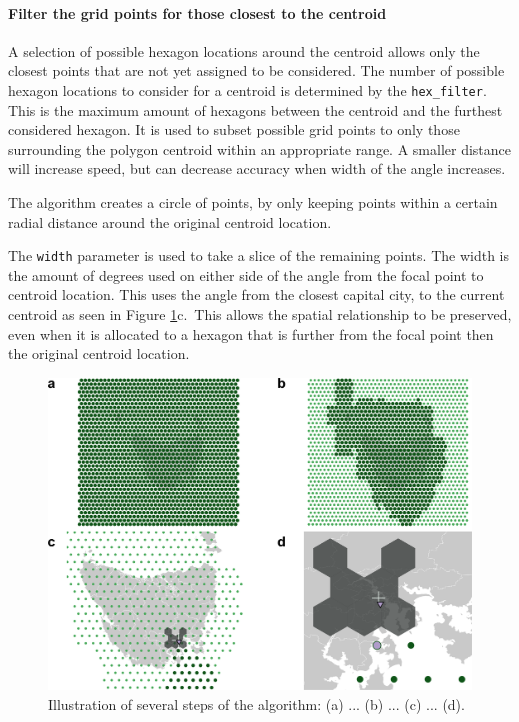 \hypertarget{filter-the-grid-points-for-those-closest-to-the-centroid}{%
\paragraph{Filter the grid points for those closest to the
centroid}\label{filter-the-grid-points-for-those-closest-to-the-centroid}}

A selection of possible hexagon locations around the centroid allows
only the closest points that are not yet assigned to be considered. The
number of possible hexagon locations to consider for a centroid is
determined by the \texttt{hex\_filter}. This is the maximum amount of
hexagons between the centroid and the furthest considered hexagon. It is
used to subset possible grid points to only those surrounding the
polygon centroid within an appropriate range. A smaller distance will
increase speed, but can decrease accuracy when width of the angle
increases.

The algorithm creates a circle of points, by only keeping points within
a certain radial distance around the original centroid location.

The \texttt{width} parameter is used to take a slice of the remaining
points. The width is the amount of degrees used on either side of the
angle from the focal point to centroid location. This uses the angle
from the closest capital city, to the current centroid as seen in Figure
\ref{fig:filterprocess}c.~This allows the spatial relationship to be
preserved, even when it is allocated to a hexagon that is further from
the focal point then the original centroid location.

\begin{Schunk}
\begin{figure}
\includegraphics[width=0.95\linewidth]{kobakian-cook_files/figure-latex/filterprocess-1} \caption[Illustration of several steps of the algorithm]{Illustration of several steps of the algorithm: (a) ... (b) ... (c) ... (d). }\label{fig:filterprocess}
\end{figure}
\end{Schunk}

